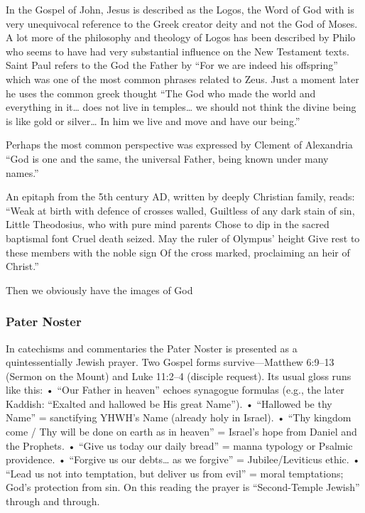 In the Gospel of John, Jesus is described as the Logos, the Word of God with is very unequivocal reference to the Greek creator deity and not the God of Moses.
A lot more of the philosophy and theology of Logos has been described by Philo who seems to have had very substantial influence on the New Testament texts.
Saint Paul refers to the God the Father by ``For we are indeed his offspring'' which was one of the most common phrases related to Zeus.
Just a moment later he uses the common greek thought ``The God who made the world and everything in it\ldots{} does not live in temples\ldots{} we should not think the divine being is like gold or silver\ldots{} In him we live and move and have our being.''

Perhaps the most common perspective was expressed by Clement of Alexandria ``God is one and the same, the universal Father, being known under many names.''

An epitaph from the 5th century AD, written by deeply Christian family, reads: ``Weak at birth with defence of crosses walled, Guiltless of any dark stain of sin, Little Theodosius, who with pure mind parents Chose to dip in the sacred baptismal font Cruel death seized.
May the ruler of Olympus' height Give rest to these members with the noble sign Of the cross marked, proclaiming an heir of Christ.''

Then we obviously have the images of God

\subsubsection{Pater Noster}\label{par:sec:pater-noster}

In catechisms and commentaries the Pater Noster is presented as a quintessentially Jewish prayer.
Two Gospel forms survive---Matthew 6:9--13 (Sermon on the Mount) and Luke 11:2--4 (disciple request).
Its usual gloss runs like this: • ``Our Father in heaven'' echoes synagogue formulas (e.g., the later Kaddish: ``Exalted and hallowed be His great Name'').
• ``Hallowed be thy Name'' = sanctifying YHWH's Name (already holy in Israel).
• ``Thy kingdom come / Thy will be done on earth as in heaven'' = Israel's hope from Daniel and the Prophets.
• ``Give us today our daily bread'' = manna typology or Psalmic providence.
• ``Forgive us our debts\ldots{} as we forgive'' = Jubilee/Leviticus ethic.
• ``Lead us not into temptation, but deliver us from evil'' = moral temptations; God's protection from sin.
On this reading the prayer is ``Second-Temple Jewish'' through and through.

